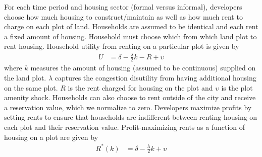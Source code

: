 \documentclass[12pt]{article}
\begin{document}



For each time period and housing sector (formal versus informal), developers choose how much housing to construct/maintain as well as how much rent to charge on each plot of land.  Households are assumed to be identical and each rent a fixed amount of housing.  Household must choose which from which land plot to rent housing.  Household utility from renting on a particular plot is given by
\begin{align*}
U &= \delta - \frac{\lambda}{2} k - R   + \upsilon 
\end{align*}
where $k$ measures the amount of housing (assumed to be continuous) supplied on the land plot.  $\lambda$ captures the congestion disutility from having additional housing on the same plot.   $R$ is the rent charged for housing on the plot and $\upsilon$ is the plot amenity shock.  Households can also choose to rent outside of the city and receive a reservation value, which we normalize to zero.  Developers maximize profits by setting rents to ensure that households are indifferent between renting housing on each plot and their reservation value.  Profit-maximizing rents as a function of housing on a plot are given by
\begin{align*}
R^{*}(k) &= \delta - \frac{\lambda}{2} k + \upsilon
\end{align*}
\end{document}
